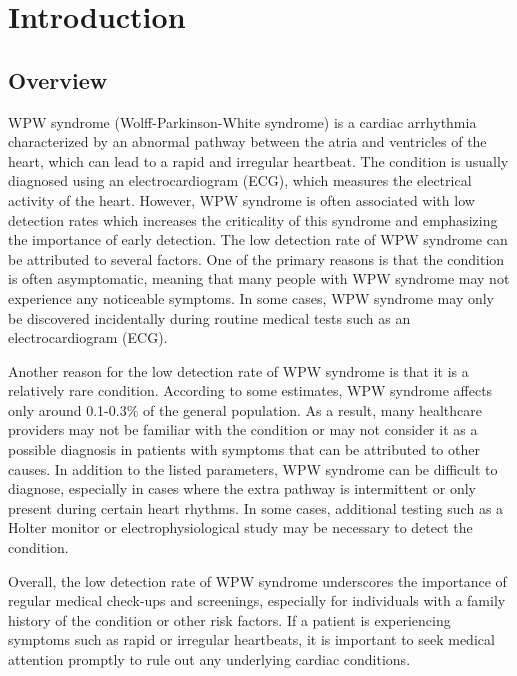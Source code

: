 \chapter{Introduction}
\section{Overview}\label{sec1}


WPW syndrome (Wolff-Parkinson-White syndrome) is a cardiac arrhythmia characterized by an abnormal pathway between the atria and ventricles of the heart, which can lead to a rapid and irregular heartbeat. The condition is usually diagnosed using an electrocardiogram (ECG), which measures the electrical activity of the heart. However, WPW syndrome is often associated with low detection rates which increases the criticality of this syndrome and emphasizing the importance of early detection. The low detection rate of WPW syndrome can be attributed to several factors. One of the primary reasons is that the condition is often asymptomatic, meaning that many people with WPW syndrome may not experience any noticeable symptoms. In some cases, WPW syndrome may only be discovered incidentally during routine medical tests such as an electrocardiogram (ECG).  

Another reason for the low detection rate of WPW syndrome is that it is a relatively rare condition. According to some estimates, WPW syndrome affects only around 0.1-0.3\% of the general population. As a result, many healthcare providers may not be familiar with the condition or may not consider it as a possible diagnosis in patients with symptoms that can be attributed to other causes. In addition to the listed parameters, WPW syndrome can be difficult to diagnose, especially in cases where the extra pathway is intermittent or only present during certain heart rhythms. In some cases, additional testing such as a Holter monitor or electrophysiological study may be necessary to detect the condition. 



Overall, the low detection rate of WPW syndrome underscores the importance of regular medical check-ups and screenings, especially for individuals with a family history of the condition or other risk factors. If a patient is experiencing symptoms such as rapid or irregular heartbeats, it is important to seek medical attention promptly to rule out any underlying cardiac conditions.  




